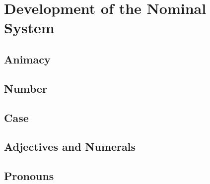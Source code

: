 \documentclass[grammar]{subfiles}
\begin{document}
\Tbw

\section{Development of the Nominal System}
\label{sec:history:pt:nominal_development}

\Tbw

\subsection{Animacy}
\label{ssec:history:pt:nd:animacy}

\Tbw

\subsection{Number}
\label{ssec:history:pt:nd:number}

\Tbw

\subsection{Case}
\label{ssec:history:pt:nd:case}

\Tbw

\subsection{Adjectives and Numerals}
\label{ssec:history:pt:nd:adjectives_numerals}

\Tbw

\subsection{Pronouns}
\label{ssec:history:pt:nd:pronouns}

\Tbw
\end{document}
